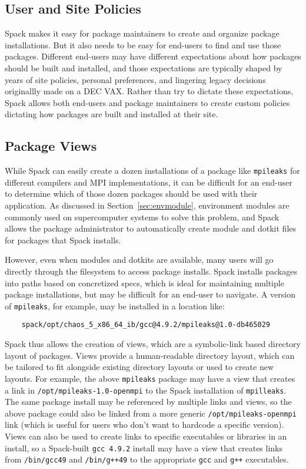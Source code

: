 
\subsection{User and Site Policies}
\label{sec:usecase-policy}

Spack makes it easy for package maintainers to create and organize package installations.  But it also needs to be easy for end-users to find and use those packages.  Different end-users may have different expectations about how packages should be built and installed, and those expectations are typically shaped by years of site policies, personal preferences, and lingering legacy decisions originallly made on a DEC VAX.  Rather than try to dictate these expectations, Spack allows both end-users and package maintainers to create custom policies dictating how packages are built and installed at their site.

\subsection{Package Views}
\label{sec:package-views}

While Spack can easily create a dozen installations of a package like {\tt mpileaks} for different compilers and MPI implementations, it can be difficult for an end-user to determine which of those dozen packages should be used with their application.  As discussed in Section~\ref{sec:envmodule}, environment modules are commonly used on supercomputer systems to solve this problem, and Spack allows the package administrator to automatically create module and dotkit files for packages that Spack installs.

However, even when modules and dotkits are available, many users will go directly through the filesystem to access package installs.  Spack installs packages into paths based on concretized specs, which is ideal for maintaining multiple package installations, but may be difficult for an end-user to navigate.  A version of {\tt mpileaks}, for example, may be installed in a location like:
%
\begin{verbatim}
    spack/opt/chaos_5_x86_64_ib/gcc@4.9.2/mpileaks@1.0-db465029
\end{verbatim}
%
Spack thus allows the creation of views, which are a symbolic-link based directory layout of packages.  Views provide a human-readable directory layout, which can be tailored to fit alongside existing directory layouts or used to create new layouts.  For example, the above {\tt mpileaks} package may have a view that creates a link in {\tt /opt/mpileaks-1.0-openmpi} to the Spack installation of {\tt mpilleaks}.  The same package install may be referenced by multiple links and views, so the above package could also be linked from a more generic {\tt /opt/mpileaks-openmpi} link (which is useful for users who don't want to hardcode a specific version).  Views can also be used to create links to specific executables or libraries in an install, so a Spack-built {\tt gcc 4.9.2} install may have a view that creates links from {\tt /bin/gcc49} and {\tt /bin/g++49} to the appropriate {\tt gcc} and {\tt g++} executables.

